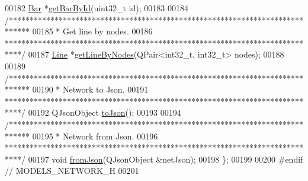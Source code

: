 \begin{DoxyCode}
00182   \hyperlink{class_bar}{Bar} *\hyperlink{group___graphics_ga04d524ce0fa0dd0d06deda92b1597af0}{getBarById}(uint32\_t \textcolor{keywordtype}{id});
00183 
00184   \textcolor{comment}{/*****************************************************************************}
00185 \textcolor{comment}{   * Get line by nodes.}
00186 \textcolor{comment}{   ****************************************************************************/}
00187   \hyperlink{class_line}{Line} *\hyperlink{group___graphics_ga8f090b85a7779695cb9f05b6395b3044}{getLineByNodes}(QPair<int32\_t, int32\_t> nodes);
00188 
00189   \textcolor{comment}{/*****************************************************************************}
00190 \textcolor{comment}{   * Network to Json.}
00191 \textcolor{comment}{   ****************************************************************************/}
00192   QJsonObject \hyperlink{group___graphics_ga1bb9773d3935eefef84136d388786494}{toJson}();
00193 
00194   \textcolor{comment}{/*****************************************************************************}
00195 \textcolor{comment}{   * Network from Json.}
00196 \textcolor{comment}{   ****************************************************************************/}
00197   \textcolor{keywordtype}{void} \hyperlink{group___graphics_ga2aef0f6c0d9569ec4d6b948d1ef0d5f1}{fromJson}(QJsonObject &netJson);
00198 \};
00199 
00200 \textcolor{preprocessor}{#endif  // MODELS\_NETWORK\_H}
00201 
\end{DoxyCode}
